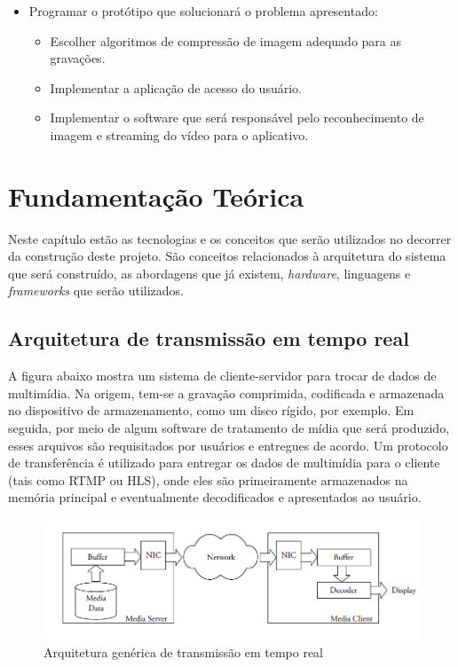\documentclass[12pt, %
openright, 
oneside, %
a4paper,    %
brazil]{facom-ufu-abntex2}
\begin{document}
\begin{itemize}
  \item  Programar o protótipo que solucionará o problema apresentado:
  \begin{itemize}
    \item Escolher algoritmos de compressão de imagem adequado para as gravações.
    \item Implementar a aplicação de acesso do usuário.
    \item Implementar o software que será responsável pelo reconhecimento de imagem e streaming do vídeo para o aplicativo.
  \end{itemize}
\end{itemize}




\chapter{Fundamentação Teórica}


Neste capítulo estão as tecnologias e os conceitos que serão utilizados no decorrer da construção deste projeto.
São conceitos relacionados à arquitetura do sistema que será construído, as abordagens que já existem, \emph{hardware}, 
linguagens e \emph{frameworks} que serão utilizados.


\section{Arquitetura de transmissão em tempo real}
 
A figura abaixo mostra um sistema de cliente-servidor para trocar de dados de multimídia.
Na origem, tem-se a gravação comprimida, codificada e armazenada no dispositivo de armazenamento,
como um disco rígido, por exemplo. Em seguida, por meio de algum software de tratamento de mídia que será produzido,
esses arquivos são requisitados por usuários e entregues de acordo. Um protocolo de transferência é utilizado para
entregar os dados de multimídia para o cliente (tais como RTMP ou HLS), onde eles são primeiramente armazenados
na memória principal e eventualmente decodificados e apresentados ao usuário. \cite{lee2005scalable}


\begin{figure}[!ht]
  \centering
\includegraphics[width=1\linewidth]{Capturar.PNG}
\caption[Representação de um arquitetura de tempo real genérica]{Arquitetura genérica de transmissão em tempo real}
\label{fig:graficosVariandoTamanhoRede}
\end{figure}
\end{document}
